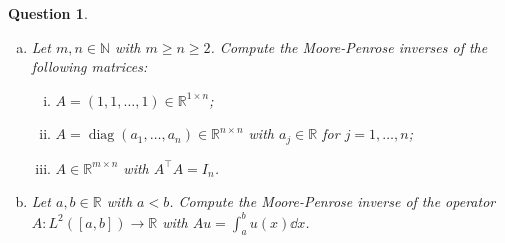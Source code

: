 \documentclass{article}
\theoremstyle{plain}
\newtheorem{question}{Question}
\theoremstyle{remark}
\newcommand{\Bb}{\mathbb}
\newcommand{\NN}{\Bb N}
\newcommand{\RR}{\Bb R}
\newcommand{\T}{^\top} %
\DeclareMathOperator\diag{diag}
\begin{document}
\begin{question}
	\begin{enumerate}[(a)]
		\item 

	Let $m, n \in \NN$ with $m \geq n \geq 2$. Compute the Moore-Penrose inverses of the following matrices:
	\begin{enumerate}[(i)]
		\item $A = (1, 1, \dotsc, 1) \in \RR^{1 \times n}$;
		\item $A = \diag(a_1, \dotsc, a_n) \in \RR^{n \times n}$ with $a_j \in \RR$ for $j = 1, \dotsc, n$;
		\item $A \in \RR^{m \times n}$ with $A\T A = I_n$. 
	\end{enumerate}

\item Let $a, b \in \RR$ with $a < b$. Compute the Moore-Penrose inverse of the operator $A \colon L^2([a, b]) \to \RR$ with $Au = \int_a^b u(x) \dd{x}$. 
	\end{enumerate}
\end{question}
\end{document}
